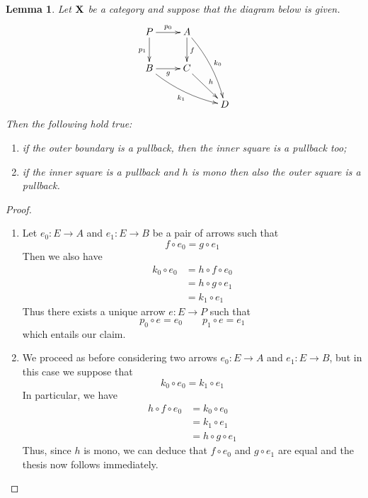\documentclass[a4paper,twoside]{report}
\def\X{\textbf {\textup{X}}}
\newtheorem{lemma}[theorem]{Lemma}
\theoremstyle{definition}
\begin{document}
\begin{lemma}\label{lem:pushandpullpb}
	Let $\X$ be a category and suppose that the diagram below is given.
	\[\xymatrix{ P \ar[r]^{p_0} \ar[d]_{p_1}& A  \ar@/^.2cm/[ddr]^{k_0}\ar[d]^{f}\\  B  \ar@/_.2cm/[drr]_{k_1} \ar[r]_g & C \ar[dr]^{h}\\&& D }\]
	Then the following hold true:
	\begin{enumerate}
		\item if the outer boundary is a pullback, then the inner square is a pullback too;
		\item if the inner square is a pullback and $h$ is mono then also the outer square is a pullback.
	\end{enumerate}
\end{lemma}
\begin{proof}\begin{enumerate}
		\item Let $e_0\colon E\to A$ and $e_1\colon E\to B$ be a pair of arrows such that 
		\[f\circ e_0=g\circ e_1\]
		Then we also have 
		\begin{align*}
		k_0\circ e_0 &= h\circ f\circ e_0\\&=h\circ g \circ e_1\\&=k_1\circ e_1
		\end{align*}
		Thus there exists a unique arrow $e\colon E\to P$ such that
		\[p_0\circ e= e_0 \qquad p_1\circ e=e_1\]
		which entails our claim.
		\item We proceed as before considering two arrows $e_0\colon E\to A$ and $e_1\colon E\to B$, but in this case we suppose that 
		\[k_0\circ e_0=k_1\circ e_1\]
		In particular, we have
		\begin{align*}
			h\circ f \circ e_0 &= k_0\circ e_0\\&=k_1\circ e_1\\&=h\circ g\circ e_1
		\end{align*}
		Thus, since $h$ is mono, we can deduce that $f\circ e_0$ and $g\circ e_1$ are equal and the thesis now follows immediately.
		\qedhere 
	\end{enumerate}
	\end{proof} 
	
\end{document}
